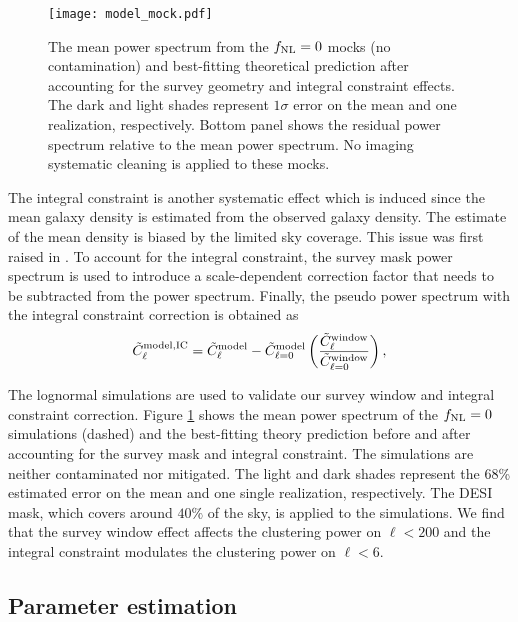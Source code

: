  \begin{figure}
\centering
\texttt{[image: model\_mock.pdf]}
\caption{The mean power spectrum from the $f_{\rm NL}=0$ mocks (no contamination) and best-fitting theoretical prediction after accounting for the survey geometry and integral constraint effects. The dark and light shades represent $1\sigma$ error on the mean and one realization, respectively. Bottom panel shows the residual power spectrum relative to the mean power spectrum. No imaging systematic cleaning is applied to these mocks.}\label{fig:model_mock}
\end{figure}

The integral constraint is another systematic effect which is induced since the mean galaxy density is estimated from the observed galaxy density. The estimate of the mean density is biased by the limited sky coverage. This issue was first raised in \cite{peacock1991large}. To account for the integral constraint, the survey mask power spectrum is used to introduce a scale-dependent correction factor that needs to be subtracted from the power spectrum. Finally, the pseudo power spectrum with the integral constraint correction is obtained as
\begin{equation}
     \tilde{C}^{\rm model, IC}_{\ell} = \tilde{C}^{\rm model}_{\ell} - \tilde{C}^{\rm model}_{\ell=0} \left(\frac{\tilde{C}^{\rm window}_{\ell}}{\tilde{C}^{\rm window}_{\ell=0}}\right),
\end{equation}

The lognormal simulations are used to validate our survey window and integral constraint correction. Figure \ref{fig:model_mock} shows the mean power spectrum of the $f_{\rm NL}=0$ simulations (dashed) and the best-fitting theory prediction before and after accounting for the survey mask and integral constraint. The simulations are neither contaminated nor mitigated. The light and dark shades represent the 68\% estimated error on the mean and one single realization, respectively. The DESI mask, which covers around $40\%$ of the sky, is applied to the simulations. We find that the survey window effect affects the clustering power on $\ell < 200$ and the integral constraint modulates the clustering power on $\ell < 6$.

\subsection{Parameter estimation}

